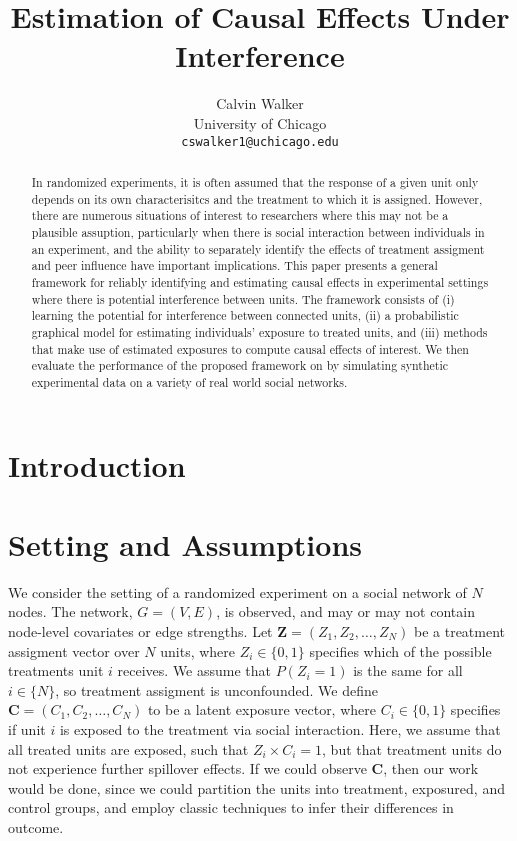\documentclass{article}
\title{Estimation of Causal Effects Under Interference}
\author{%
  Calvin Walker \\
  University of Chicago\\
  \texttt{cswalker1@uchicago.edu} \\
}
\begin{document}
\maketitle


\begin{abstract}
    In randomized experiments, it is often assumed that the response of a given unit only depends on its own characterisitcs and the treatment to which it is assigned. However, there are numerous situations of interest to researchers 
    where this may not be a plausible assuption, particularly when there is social interaction between individuals in an experiment, and the ability to separately identify the effects of treatment assigment and peer influence have important implications. 
    This paper presents a general framework for reliably identifying and estimating causal effects in experimental settings where there is potential interference between units. The framework consists of 
    (i) learning the potential for interference between connected units, (ii) a probabilistic graphical model for estimating individuals' exposure to treated units, and (iii) methods that make use of estimated exposures to compute causal effects of interest. We then evaluate the performance of the proposed framework on by simulating synthetic experimental data on a variety of real world social networks.
\end{abstract}


\section{Introduction}

\section{Setting and Assumptions}

We consider the setting of a randomized experiment on a social network of $N$ nodes. The network, $G = (V, E)$, is observed, and may or may not contain node-level covariates or edge strengths. 
Let $\mathbf{Z} = (Z_1, Z_2, \dots ,Z_N)$ be a treatment assigment vector over $N$ units, where $Z_i \in \{0, 1\}$ specifies which of the possible treatments unit $i$ receives. 
We assume that $P(Z_i = 1)$ is the same for all $i \in \{N\}$, so treatment assigment is unconfounded. We define $\mathbf{C} = (C_1, C_2, \dots, C_N)$ to be a latent exposure vector, where $C_i \in \{0, 1\}$ specifies if unit $i$ is exposed to the treatment via social interaction. 
Here, we assume that all treated units are exposed, such that $Z_i \times C_i = 1$, but that treatment units do not experience further spillover effects. %
If we could observe $\mathbf{C}$, then our work would be done, since we could partition the units into treatment, exposured, and control groups, and employ classic techniques to infer their differences in outcome. 
\end{document}
